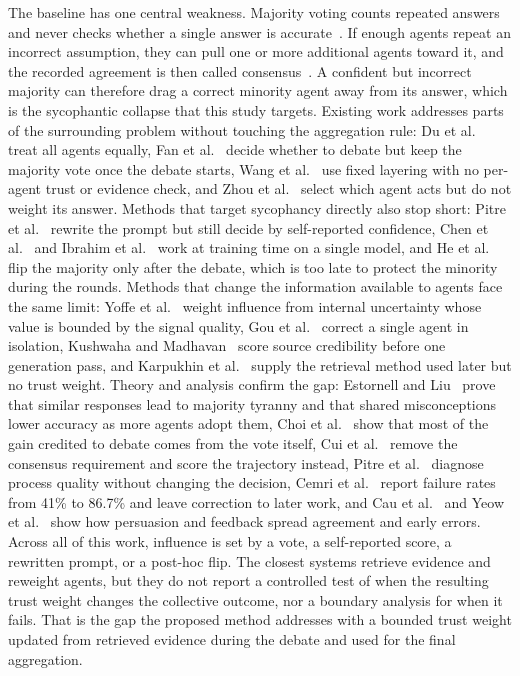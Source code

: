\documentclass[a4paper,fleqn]{cas-sc}
\begin{document}
The baseline has one central weakness. Majority voting counts repeated answers and never checks whether a single answer is accurate~\cite{choi2025debate}. If enough agents repeat an incorrect assumption, they can pull one or more additional agents toward it, and the recorded agreement is then called consensus~\cite{pitre-etal-2025-consensagent}. A confident but incorrect majority can therefore drag a correct minority agent away from its answer, which is the sycophantic collapse that this study targets. Existing work addresses parts of the surrounding problem without touching the aggregation rule: Du et al.~\cite{du2024improving} treat all agents equally, Fan et al.~\cite{fan2026imad} decide whether to debate but keep the majority vote once the debate starts, Wang et al.~\cite{wang2025mixture} use fixed layering with no per-agent trust or evidence check, and Zhou et al.~\cite{zhou2025reso} select which agent acts but do not weight its answer. Methods that target sycophancy directly also stop short: Pitre et al.~\cite{pitre-etal-2025-consensagent} rewrite the prompt but still decide by self-reported confidence, Chen et al.~\cite{chen2025self} and Ibrahim et al.~\cite{ibrahim2026training} work at training time on a single model, and He et al.~\cite{he2026minority} flip the majority only after the debate, which is too late to protect the minority during the rounds. Methods that change the information available to agents face the same limit: Yoffe et al.~\cite{yoffe-etal-2025-debunc} weight influence from internal uncertainty whose value is bounded by the signal quality, Gou et al.~\cite{gou2024critic} correct a single agent in isolation, Kushwaha and Madhavan~\cite{kushwaha2026agentbased} score source credibility before one generation pass, and Karpukhin et al.~\cite{karpukhin2020dense} supply the retrieval method used later but no trust weight. Theory and analysis confirm the gap: Estornell and Liu~\cite{estornell2024multillm} prove that similar responses lead to majority tyranny and that shared misconceptions lower accuracy as more agents adopt them, Choi et al.~\cite{choi2025debate} show that most of the gain credited to debate comes from the vote itself, Cui et al.~\cite{cui2026freemad} remove the consensus requirement and score the trajectory instead, Pitre et al.~\cite{pitre2026diagnostic} diagnose process quality without changing the decision, Cemri et al.~\cite{cemri2025why} report failure rates from 41\% to 86.7\% and leave correction to later work, and Cau et al.~\cite{cau2025selective} and Yeow et al.~\cite{yeow2025reliable} show how persuasion and feedback spread agreement and early errors. Across all of this work, influence is set by a vote, a self-reported score, a rewritten prompt, or a post-hoc flip. The closest systems retrieve evidence and reweight agents, but they do not report a controlled test of when the resulting trust weight changes the collective outcome, nor a boundary analysis for when it fails. That is the gap the proposed method addresses with a bounded trust weight updated from retrieved evidence during the debate and used for the final aggregation.
\end{document}
